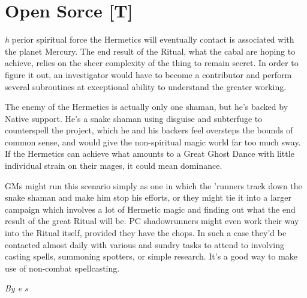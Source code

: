 \documentclass[letterpaper,twocolumn,10.5pt]{article}
\newenvironment{scenario}[6]
	{
		\section{#1 {\small[#2]}}
		\textit{#3}
		\def\TMPSCENARIO{#4 #5}
	}
	{\small\textit{By \TMPSCENARIO}}
\begin{document}
\begin{scenario}{Open Sorce}
The superior spiritual force the Hermetics will eventually contact is associated with the planet Mercury. The end result of the Ritual, what the cabal are hoping to achieve, relies on the sheer complexity of the thing to remain secret. In order to figure it out, an investigator would have to become a contributor and perform several subroutines at exceptional ability to understand the greater working.

The enemy of the Hermetics is actually only one shaman, but he's backed by Native support. He's a snake shaman using disguise and subterfuge to counterspell the project, which he and his backers feel oversteps the bounds of common sense, and would give the non-spiritual magic world far too much sway. If the Hermetics can achieve what amounts to a Great Ghost Dance with little individual strain on their mages, it could mean dominance.

GMs might run this scenario simply as one in which the 'runners track down the snake shaman and make him stop his efforts, or they might tie it into a larger campaign which involves a lot of Hermetic magic and finding out what the end result of the great Ritual will be. PC shadowrunners might even work their way into the Ritual itself, provided they have the chops. In such a case they'd be contacted almost daily with various and sundry tasks to attend to involving casting spells, summoning spotters, or simple research. It's a good way to make use of non-combat spellcasting. 

\end{scenario}
\end{document}
